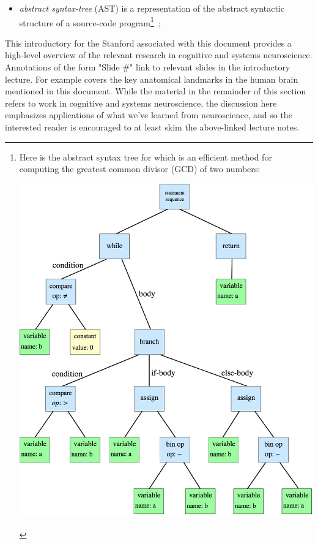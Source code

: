\begin{itemize}
%
\item {\it{abstract syntax-tree}} (AST) is a representation of the abstract syntactic structure of a source-code program\footnote{%
%
  Here is the abstract syntax tree for {} which is an efficient method for computing the greatest common divisor (GCD) of two numbers:
  \begin{center}
    \includegraphics[width=6.0in]{./figures/Euclids_Greatest_Common_Divisor_Method.png}
  \end{center}}~\cite{DevlinetalICLR-18,WangetalCoRR-17};
% 
\end{itemize}

This introductory {} for the Stanford {} associated with this document provides a high-level overview of the relevant research in cognitive and systems neuroscience. Annotations of the form "Slide \#" link to relevant slides in the introductory lecture. For example {{}} covers the key anatomical landmarks in the human brain mentioned in this document. While the material in the remainder of this section refers to work in cognitive and systems neuroscience, the discussion here emphasizes applications of what we've learned from neuroscience, and so the interested reader is encouraged to at least skim the above-linked lecture notes.

